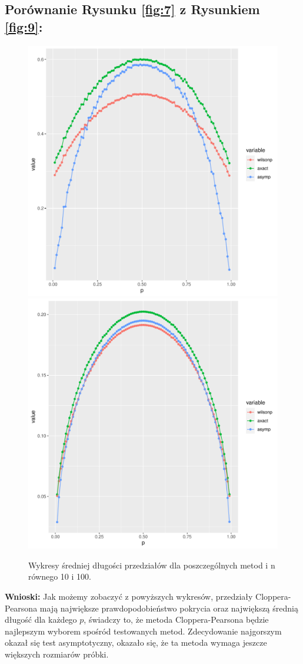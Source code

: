 \documentclass[12pt]{mwart}\usepackage[]{graphicx}\usepackage[]{color}
\newenvironment{knitrout}{}{} %
\begin{document}
\subsection*{Porównanie Rysunku \ref{fig:7} z Rysunkiem \ref{fig:9}:}
\begin{knitrout}
\color{fgcolor}\begin{figure}[H]
\includegraphics[width=0.5\linewidth]{figure/fig_11-1} 
\includegraphics[width=0.5\linewidth]{figure/fig_11-2} \caption{\label{fig:11}Wykresy średniej długości przedziałów dla poszczególnych metod i n równego 10 i 100.}\label{fig:fig_11}
\end{figure}

\end{knitrout}
\textbf{Wnioski:}\newline
Jak możemy zobaczyć z powyższych wykresów, przedziały Cloppera-Pearsona mają największe prawdopodobieństwo pokrycia oraz największą średnią długość dla każdego $p$, świadczy to, że metoda Cloppera-Pearsona będzie najlepszym wyborem spośród testowanych metod. Zdecydowanie najgorszym okazał się test asymptotyczny, okazało się, że ta metoda wymaga jeszcze większych rozmiarów próbki.
\end{document}
